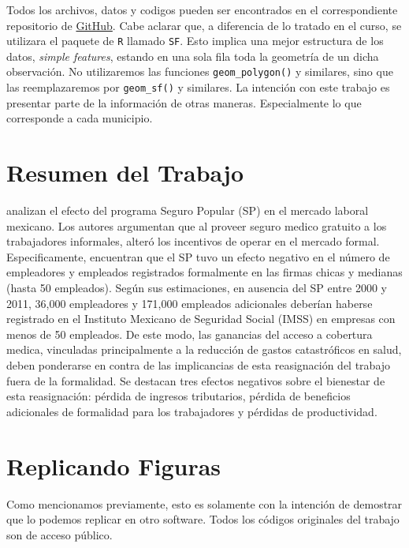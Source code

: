 \documentclass[9pt]{article}
\begin{document}
Todos los archivos, datos y c\’odigos pueden ser encontrados en el correspondiente repositorio de \href{https://github.com/joaquinliwski/Herramientas-Computacionales-Liwski-Sury-Trabajo-Final.git}{GitHub}. Cabe aclarar que, a diferencia de lo tratado en el curso, se utilizara el paquete de \texttt{R} llamado \texttt{SF}. Esto implica una mejor estructura de los datos, \textit{simple features}, estando en una sola fila toda la geometr\'ia de un dicha observaci\'on. No utilizaremos las funciones \texttt{geom\_polygon()} y similares, sino que las reemplazaremos por \texttt{geom\_sf()} y similares. 
La intenci\'on con este trabajo es presentar parte de la informaci\'on de otras maneras. Especialmente lo que corresponde a cada municipio. 

\section*{Resumen del Trabajo}
\cite{10.1257/pol.6.4.71}  analizan el efecto del programa Seguro Popular (SP) en el mercado laboral mexicano. Los autores argumentan que al proveer seguro medico gratuito a los trabajadores informales, alteró los incentivos de operar en el mercado formal. Especificamente, encuentran que el SP tuvo un efecto negativo en el número de empleadores y empleados registrados formalmente en las firmas chicas y medianas (hasta 50 empleados). Según sus estimaciones, en ausencia del SP entre 2000 y 2011, 36,000 empleadores y 171,000 empleados adicionales deberían haberse registrado en el Instituto Mexicano de Seguridad Social (IMSS) en empresas con menos de 50 empleados. De este modo, las ganancias del acceso a cobertura medica, vinculadas principalmente a la reducción de gastos catastróficos en salud, deben ponderarse en contra de las implicancias de esta reasignación del trabajo fuera de la formalidad. Se destacan tres efectos negativos sobre el bienestar de esta reasignación: pérdida de ingresos tributarios, pérdida de beneficios adicionales de formalidad para los trabajadores y pérdidas de productividad.

\section*{Replicando Figuras}
 Como mencionamos previamente, esto es solamente con la intenci\'on de demostrar que lo podemos replicar en otro software. Todos los c\'odigos originales del trabajo son de acceso p\'ublico.
 
\end{document}
